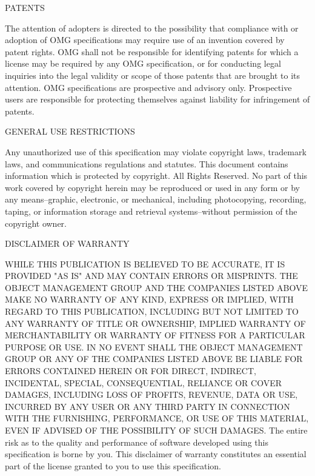 \begin{center}PATENTS\end{center}\vspace{-3mm}
The attention of adopters is directed to the possibility that compliance with or adoption of OMG specifications may require use of an invention covered by patent rights. OMG shall not be responsible for identifying patents for which a license may be required by any OMG specification, or for conducting legal inquiries into the legal validity or scope of those patents that are brought to its attention. OMG specifications are prospective and advisory only. Prospective users are responsible for protecting themselves against liability for infringement of patents.

\begin{center}GENERAL USE RESTRICTIONS\end{center}\vspace{-3mm}
Any unauthorized use of this specification may violate copyright laws, trademark laws, and communications regulations and statutes. This document contains information which is protected by copyright. All Rights Reserved. No part of this work covered by copyright herein may be reproduced or used in any form or by any means--graphic, electronic, or mechanical, including photocopying, recording, taping, or information storage and retrieval systems--without permission of the copyright owner.
\vfill\eject
\begin{center}DISCLAIMER OF WARRANTY\end{center}\vspace{-3mm}
WHILE THIS PUBLICATION IS BELIEVED TO BE ACCURATE, IT IS PROVIDED "AS IS" AND MAY CONTAIN ERRORS OR MISPRINTS. THE OBJECT MANAGEMENT GROUP AND THE COMPANIES LISTED ABOVE MAKE NO WARRANTY OF ANY KIND, EXPRESS OR IMPLIED, WITH REGARD TO THIS PUBLICATION, INCLUDING BUT NOT LIMITED TO ANY WARRANTY OF TITLE OR OWNERSHIP, IMPLIED WARRANTY OF MERCHANTABILITY OR WARRANTY OF FITNESS FOR A PARTICULAR PURPOSE OR USE.  IN NO EVENT SHALL THE OBJECT MANAGEMENT GROUP OR ANY OF THE COMPANIES LISTED ABOVE BE LIABLE FOR ERRORS CONTAINED HEREIN OR FOR DIRECT, INDIRECT, INCIDENTAL, SPECIAL, CONSEQUENTIAL, RELIANCE OR COVER DAMAGES, INCLUDING LOSS OF PROFITS, REVENUE, DATA OR USE, INCURRED BY ANY USER OR ANY THIRD PARTY IN CONNECTION WITH THE FURNISHING, PERFORMANCE, OR USE OF THIS MATERIAL, EVEN IF ADVISED OF THE POSSIBILITY OF SUCH DAMAGES. 
The entire risk as to the quality and performance of software developed using this specification is borne by you. This disclaimer of warranty constitutes an essential part of the license granted to you to use this specification.

